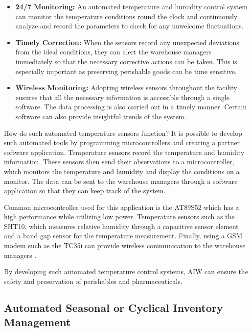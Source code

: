 \documentclass{report}
\begin{document}
\begin{itemize}
    \item {\bfseries 24/7 Monitoring:} An automated temperature and humidity control system can monitor the temperature conditions round the clock and continuously analyze and record the parameters to check for any unwelcome fluctuations.
    \item {\bfseries Timely Correction:} When the sensors record any unexpected deviations from the ideal conditions, they can alert the warehouse managers immediately so that the necessary corrective actions can be taken. This is especially important as preserving perishable goods can be time sensitive.
    \item {\bfseries Wireless Monitoring:} Adopting wireless sensors throughout the facility ensures that all the necessary information is accessible through a single software. The data processing is also carried out in a timely manner. Certain software can also provide insightful trends of the system.
\end{itemize}

How do such automated temperature sensors function? It is possible to develop such automated tools by programming microcontrollers and creating a partner software application. Temperature sensors record the temperature and humidity information. These sensors then send their observations to a microcontroller, which monitors the temperature and humidity and display the conditions on a monitor. The data can be sent to the warehouse managers through a software application so that they can keep track of the system. 

Common microcontroller used for this application is the AT89S52 which has a high performance while utilizing low power. Temperature sensors such as the SHT10, which measures relative humidity through a capacitive sensor element and a band gap sensor for the temperature measurement. Finally, using a GSM modem such as the TC35i can provide wireless communication to the warehouse managers \cite{Sihombing_2018}.

\bigskip

By developing such automated temperature control systems, AIW can ensure the safety and preservation of perishables and pharmaceuticals.

\subsection{Automated Seasonal or Cyclical Inventory Management}
\end{document}
